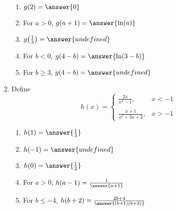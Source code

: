 \documentclass{ximera}
\begin{document}
\begin{exercise}
\begin{enumerate}
\begin{enumerate}
\item $g(2) = \answer{0}$

\item For $a>0$, $g(a+1) = \answer{\ln(a)}$

\item $g\!\left(\frac{1}{3}\right) = \answer{undefined}$


\item For $b<0$, $g(4-b) = \answer{\ln(3-b)}$

\item For $b\ge 3$, $g(4-b) = \answer{undefined}$
\end{enumerate}

\item Define \begin{equation*}
	h(x) = \begin{cases}
		\frac{2x}{x^2-1},  & x < -1 \\
		\\
		\frac{x+1}{x^2+3x+2},  & x> -1 
		\end{cases}
		\end{equation*}
	\begin{enumerate}
	\item $h(1) = \answer{\frac{1}{3}}$
	
	\item $h(-1) = \answer{undefined}$
	
	\item $h(0) = \answer{\frac{1}{2}}$
	
	\item For $a>0$, $h(a-1) = \frac{1}{\answer{a+1}}$
	
	\item For $b \leq -4$, $h(b+2) =\frac{2b + 4}{\answer{(b+ 1)(b+3)}}$
	\end{enumerate}
\end{enumerate}

\end{exercise}
\end{document}
